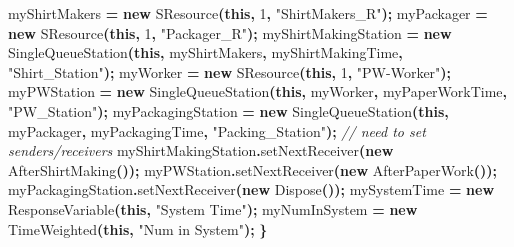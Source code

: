 \documentclass[
]{book}
\newenvironment{Shaded}{\begin{snugshade}}{\end{snugshade}}
\newcommand{\CommentTok}[1]{\textcolor[rgb]{0.56,0.35,0.01}{\textit{#1}}}
\newcommand{\DecValTok}[1]{\textcolor[rgb]{0.00,0.00,0.81}{#1}}
\newcommand{\FunctionTok}[1]{\textcolor[rgb]{0.00,0.00,0.00}{#1}}
\newcommand{\KeywordTok}[1]{\textcolor[rgb]{0.13,0.29,0.53}{\textbf{#1}}}
\newcommand{\NormalTok}[1]{#1}
\newcommand{\OperatorTok}[1]{\textcolor[rgb]{0.81,0.36,0.00}{\textbf{#1}}}
\newcommand{\StringTok}[1]{\textcolor[rgb]{0.31,0.60,0.02}{#1}}
\theoremstyle{definition}
\theoremstyle{definition}
\theoremstyle{definition}
\theoremstyle{definition}
\theoremstyle{remark}
\begin{document}
\begin{Shaded}
\begin{Highlighting}[]
\NormalTok{        myShirtMakers }\OperatorTok{=} \KeywordTok{new} \FunctionTok{SResource}\OperatorTok{(}\KeywordTok{this}\OperatorTok{,} \DecValTok{1}\OperatorTok{,} \StringTok{"ShirtMakers\_R"}\OperatorTok{);}
\NormalTok{        myPackager }\OperatorTok{=} \KeywordTok{new} \FunctionTok{SResource}\OperatorTok{(}\KeywordTok{this}\OperatorTok{,} \DecValTok{1}\OperatorTok{,} \StringTok{"Packager\_R"}\OperatorTok{);}
\NormalTok{        myShirtMakingStation }\OperatorTok{=} \KeywordTok{new} \FunctionTok{SingleQueueStation}\OperatorTok{(}\KeywordTok{this}\OperatorTok{,}\NormalTok{ myShirtMakers}\OperatorTok{,}
\NormalTok{                myShirtMakingTime}\OperatorTok{,} \StringTok{"Shirt\_Station"}\OperatorTok{);}
\NormalTok{        myWorker }\OperatorTok{=} \KeywordTok{new} \FunctionTok{SResource}\OperatorTok{(}\KeywordTok{this}\OperatorTok{,} \DecValTok{1}\OperatorTok{,} \StringTok{"PW{-}Worker"}\OperatorTok{);}
\NormalTok{        myPWStation }\OperatorTok{=} \KeywordTok{new} \FunctionTok{SingleQueueStation}\OperatorTok{(}\KeywordTok{this}\OperatorTok{,}\NormalTok{ myWorker}\OperatorTok{,}
\NormalTok{                myPaperWorkTime}\OperatorTok{,} \StringTok{"PW\_Station"}\OperatorTok{);}
\NormalTok{        myPackagingStation }\OperatorTok{=} \KeywordTok{new} \FunctionTok{SingleQueueStation}\OperatorTok{(}\KeywordTok{this}\OperatorTok{,}\NormalTok{ myPackager}\OperatorTok{,}
\NormalTok{                myPackagingTime}\OperatorTok{,} \StringTok{"Packing\_Station"}\OperatorTok{);}
        \CommentTok{// need to set senders/receivers}
\NormalTok{        myShirtMakingStation}\OperatorTok{.}\FunctionTok{setNextReceiver}\OperatorTok{(}\KeywordTok{new} \FunctionTok{AfterShirtMaking}\OperatorTok{());}
\NormalTok{        myPWStation}\OperatorTok{.}\FunctionTok{setNextReceiver}\OperatorTok{(}\KeywordTok{new} \FunctionTok{AfterPaperWork}\OperatorTok{());}
\NormalTok{        myPackagingStation}\OperatorTok{.}\FunctionTok{setNextReceiver}\OperatorTok{(}\KeywordTok{new} \FunctionTok{Dispose}\OperatorTok{());}
\NormalTok{        mySystemTime }\OperatorTok{=} \KeywordTok{new} \FunctionTok{ResponseVariable}\OperatorTok{(}\KeywordTok{this}\OperatorTok{,} \StringTok{"System Time"}\OperatorTok{);}
\NormalTok{        myNumInSystem }\OperatorTok{=} \KeywordTok{new} \FunctionTok{TimeWeighted}\OperatorTok{(}\KeywordTok{this}\OperatorTok{,} \StringTok{"Num in System"}\OperatorTok{);}
    \OperatorTok{\}}
\end{Highlighting}
\end{Shaded}
\end{document}
